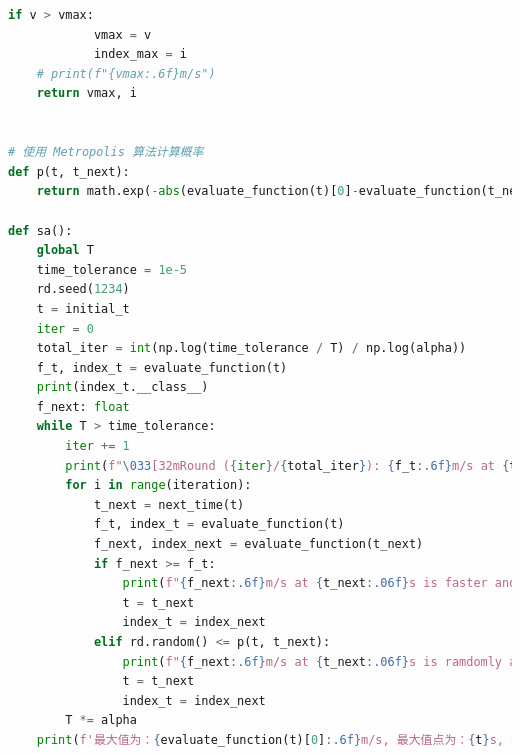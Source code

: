 \documentclass[a4paper]{article}
\begin{document}
\begin{lstlisting}[language=python,columns=fullflexible,frame=shadowbox]
        if v > vmax:
            vmax = v
            index_max = i
    # print(f"{vmax:.6f}m/s")
    return vmax, i


# 使用 Metropolis 算法计算概率
def p(t, t_next):
    return math.exp(-abs(evaluate_function(t)[0]-evaluate_function(t_next)[0])/(T * 0.01))

def sa():
    global T
    time_tolerance = 1e-5
    rd.seed(1234)
    t = initial_t
    iter = 0
    total_iter = int(np.log(time_tolerance / T) / np.log(alpha))
    f_t, index_t = evaluate_function(t)
    print(index_t.__class__)
    f_next: float
    while T > time_tolerance:
        iter += 1
        print(f"\033[32mRound ({iter}/{total_iter}): {f_t:.6f}m/s at {t:.6f}s when T={T:.06f}\033[0m")
        for i in range(iteration):
            t_next = next_time(t)
            f_t, index_t = evaluate_function(t)
            f_next, index_next = evaluate_function(t_next)
            if f_next >= f_t:
                print(f"{f_next:.6f}m/s at {t_next:.06f}s is faster and accpected")
                t = t_next
                index_t = index_next
            elif rd.random() <= p(t, t_next):
                print(f"{f_next:.6f}m/s at {t_next:.06f}s is ramdomly accepted")
                t = t_next
                index_t = index_next
        T *= alpha
    print(f'最大值为：{evaluate_function(t)[0]:.6f}m/s, 最大值点为：{t}s, 把手号为：{index_t}')

	\end{lstlisting}
\end{document}
